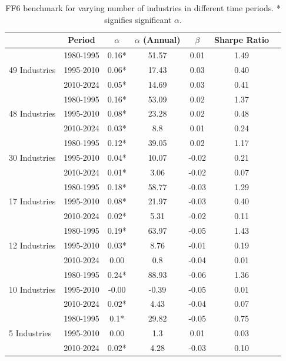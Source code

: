 \documentclass{article}
\begin{document}
\begin{table}[h]
    \centering
    \begin{tabular}{lcccccc}
        \toprule
        & Period & $\alpha$ & $\alpha$ (Annual) & $\beta$ & Sharpe Ratio \\
        \midrule
        \multirow{3}{*}{49 Industries} & 1980-1995 & 0.16* & 51.57 & 0.01 & 1.49 \\
                                       & 1995-2010 & 0.06* & 17.43 & 0.03 & 0.40 \\
                                       & 2010-2024 & 0.05* & 14.69 & 0.03 & 0.41 \\
        \midrule
        \multirow{3}{*}{48 Industries} & 1980-1995 & 0.16* & 53.09 & 0.02 & 1.37 \\
                                       & 1995-2010 & 0.08* & 23.28 & 0.02 & 0.48 \\
                                       & 2010-2024 & 0.03* & 8.8 & 0.01 & 0.24 \\
        \midrule
        \multirow{3}{*}{30 Industries} & 1980-1995 & 0.12* & 39.05 & 0.02 & 1.17 \\
                                       & 1995-2010 & 0.04* & 10.07 & -0.02 & 0.21 \\
                                       & 2010-2024 & 0.01* & 3.06 & -0.02 & 0.07 \\
        \midrule
        \multirow{3}{*}{17 Industries} & 1980-1995 & 0.18* & 58.77 & -0.03 & 1.29 \\
                                       & 1995-2010 & 0.08* & 21.97 & -0.03 & 0.40 \\
                                       & 2010-2024 & 0.02* & 5.31 & -0.02 & 0.11 \\
        \midrule
        \multirow{3}{*}{12 Industries} & 1980-1995 & 0.19* & 63.97 & -0.05 & 1.43 \\
                                       & 1995-2010 & 0.03* & 8.76 & -0.01 & 0.19 \\
                                       & 2010-2024 & 0.00 & 0.8 & -0.04 & 0.01 \\
        \midrule
        \multirow{3}{*}{10 Industries} & 1980-1995 & 0.24* & 88.93 & -0.06 & 1.36 \\
                                       & 1995-2010 & -0.00 & -0.39 & -0.05 & 0.01 \\
                                       & 2010-2024 & 0.02* & 4.43 & -0.04 & 0.07 \\
        \midrule
        \multirow{3}{*}{5 Industries} & 1980-1995 & 0.1* & 29.82 & -0.05 & 0.75 \\
                                      & 1995-2010 & 0.00 & 1.3 & 0.01 & 0.03 \\
                                      & 2010-2024 & 0.02* & 4.28 & -0.03 & 0.10 \\
        \bottomrule
    \end{tabular}
    \caption{FF6 benchmark for varying number of industries in different time periods. * signifies significant $\alpha$.}
    \label{tab:number_of_industries_comparison}
\end{table}
\end{document}
